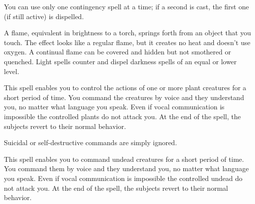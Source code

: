 \begin{multicols}{2}
\begin{small}
\smallskip\noindent You can use only one contingency spell at a time; if a second is cast, the first one (if still active) is dispelled.


\noindent A flame, equivalent in brightness to a torch, springs forth from an object that you touch. The effect looks like a regular flame, but it creates no heat and doesn't use oxygen. A continual flame can be covered and hidden but not smothered or quenched.
Light spells counter and dispel darkness spells of an equal or lower level.


\noindent This spell enables you to control the actions of one or more plant creatures for a short period of time. You command the creatures by voice and they understand you, no matter what language you speak. Even if vocal communication is impossible  the controlled plants do not attack you. At the end of the spell, the subjects revert to their normal behavior.

\smallskip\noindent Suicidal or self-destructive commands are simply ignored.

\noindent This spell enables you to command undead creatures for a short period of time. You command them by voice and they understand you, no matter what language you speak. Even if vocal communication is impossible the controlled undead do not attack you. At the end of the spell, the subjects revert to their normal behavior.


\end{small}
\end{multicols}
